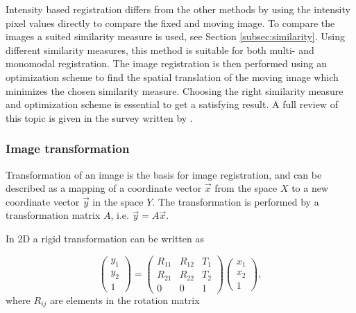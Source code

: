 Intensity based registration differs from the other methods by using the intensity pixel values directly to compare the fixed and moving image. To compare the images a suited similarity measure is used, see Section \ref{subsec:similarity}. Using different similarity measures, this method is suitable for both multi- and monomodal registration. The image registration is then performed using an optimization scheme to find the spatial translation of the moving image which minimizes the chosen similarity measure. Choosing the right similarity measure and optimization scheme is essential to get a satisfying result. A full review of this topic is given in the survey written by \citet{Maintz1998}.

%

\subsubsection{Image transformation}

Transformation of an image is the basis for image registration, and can be described as a mapping of a coordinate vector $\vec{x}$ from the space $X$ to a new coordinate vector $\vec{y}$ in the space $Y$. The transformation is performed by a transformation matrix $A$, i.e. $\vec{y} = A\vec{x}$.

In 2D a rigid transformation can be written as 

\begin{equation}
	\label{rigid}
	\begin{pmatrix}
		y_1 \\
		y_2 \\
		1 
	\end{pmatrix}
	=
	\begin{pmatrix}
		R_{11} & R_{12} & T_1\\
		R_{21} & R_{22} & T_2\\		
		0 & 0 & 1
	\end{pmatrix}
	\begin{pmatrix}
		x_1\\
		x_2\\
		1
	\end{pmatrix},
\end{equation}
where $R_{ij}$ are elements in the rotation matrix 


